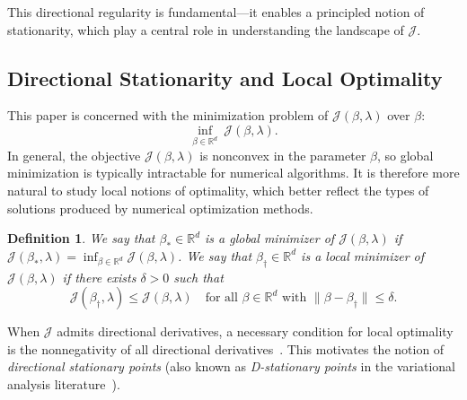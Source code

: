 \documentclass[sn-mathphys-num]{sn-jnl}%
\numberwithin{equation}{section}
\newcommand{\R}{\mathbb{R}}
\newtheorem{lemma}{Lemma}
\theoremstyle{thmstyleone}%
\theoremstyle{thmstyletwo}%
\theoremstyle{thmstylethree}%
\newtheorem{definition}{Definition}%
\begin{document}
This directional regularity is fundamental---it enables a principled notion of stationarity, which play a central role in understanding the landscape of $\mathcal{J}$. 




\subsection{Directional Stationarity and Local Optimality}
This paper is concerned with the minimization problem of $\mathcal{J}(\beta, \lambda)$ over $\beta$: 
\[
	\inf_{\beta \in \R^d}~ \mathcal{J}(\beta, \lambda).
\]
In general, the objective $\mathcal{J}(\beta, \lambda)$ is nonconvex in the parameter $\beta$, so global minimization is typically intractable for numerical algorithms. It is therefore more natural to study local notions of optimality, which better reflect the types of solutions produced by numerical optimization methods.



\vspace{.5em} 
\begin{definition}
We say that $\beta_* \in \R^d$ is a \emph{global minimizer} of $\mathcal{J}(\beta, \lambda)$ if 
$
	\mathcal{J}(\beta_*, \lambda) = \inf_{\beta \in \R^d} \mathcal{J}(\beta, \lambda)$. 
We say that $\beta_{\dagger} \in \R^d$ is a \emph{local minimizer} of $\mathcal{J}(\beta, \lambda)$ if there exists $\delta > 0$ such that
\[
	\mathcal{J}(\beta_{\dagger}, \lambda) \le \mathcal{J}(\beta, \lambda) \quad \text{for all } \beta \in \R^d \text{ with } \|\beta - \beta_{\dagger}\| \le \delta.
\]
\end{definition}

When $\mathcal{J}$ admits directional derivatives, a necessary condition for local optimality is the nonnegativity of all directional derivatives~\cite[Chapter 6]{RockafellarTyWe98}. %
This motivates the notion of \emph{directional stationary points} (also known as \emph{D-stationary points} in the variational analysis literature~\cite{RockafellarTyWe98}).

\end{document}
